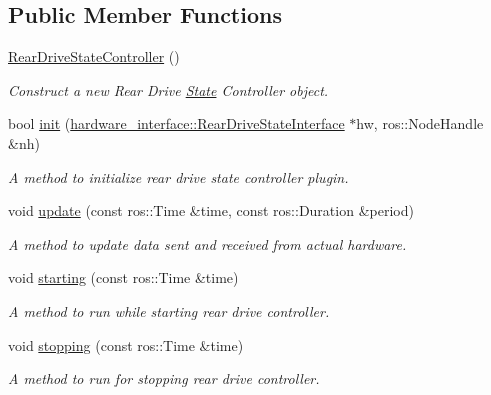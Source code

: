\subsection*{Public Member Functions}
\begin{DoxyCompactItemize}
\item 
\mbox{\label{classrear__drive__state__controller_1_1RearDriveStateController_a431ac3fabbe360518f9c12511bc2c1a1}} 
\hyperlink{classrear__drive__state__controller_1_1RearDriveStateController_a431ac3fabbe360518f9c12511bc2c1a1}{Rear\+Drive\+State\+Controller} ()
\begin{DoxyCompactList}\small\item\em Construct a new Rear Drive \hyperlink{structState}{State} Controller object. \end{DoxyCompactList}\item 
bool \hyperlink{classrear__drive__state__controller_1_1RearDriveStateController_a4cade2fa3f7bf52491431548ad6a3d97}{init} (\hyperlink{classhardware__interface_1_1RearDriveStateInterface}{hardware\+\_\+interface\+::\+Rear\+Drive\+State\+Interface} $\ast$hw, ros\+::\+Node\+Handle \&nh)
\begin{DoxyCompactList}\small\item\em A method to initialize rear drive state controller plugin. \end{DoxyCompactList}\item 
void \hyperlink{classrear__drive__state__controller_1_1RearDriveStateController_a5eee03357f95a146b72947ce5f277a41}{update} (const ros\+::\+Time \&time, const ros\+::\+Duration \&period)
\begin{DoxyCompactList}\small\item\em A method to update data sent and received from actual hardware. \end{DoxyCompactList}\item 
void \hyperlink{classrear__drive__state__controller_1_1RearDriveStateController_a53a87a7512f06f14c71a0bda39a7d37d}{starting} (const ros\+::\+Time \&time)
\begin{DoxyCompactList}\small\item\em A method to run while starting rear drive controller. \end{DoxyCompactList}\item 
void \hyperlink{classrear__drive__state__controller_1_1RearDriveStateController_af2618c5f4cadfde5a696aa6ad2ce6714}{stopping} (const ros\+::\+Time \&time)
\begin{DoxyCompactList}\small\item\em A method to run for stopping rear drive controller. \end{DoxyCompactList}\end{DoxyCompactItemize}


